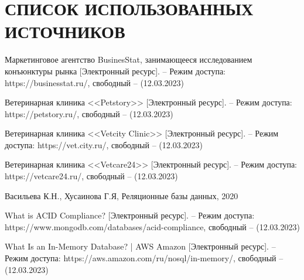 \section*{СПИСОК ИСПОЛЬЗОВАННЫХ ИСТОЧНИКОВ}

\begingroup
\renewcommand{\section}[2]{}
\begin{thebibliography}{}
	
		Маркетинговое агентство  BusinesStat, занимающееся исследованием конъюнктуры рынка [Электронный ресурс]. – Режим доступа: 
		https://businesstat.ru/,
		свободный -- (12.03.2023)
		
		Ветеринарная клиника <<Petstory>> [Электронный ресурс]. – Режим доступа:  https://petstory.ru/,
		свободный -- (12.03.2023)
		
		Ветеринарная клиника <<Vetcity Clinic>> [Электронный ресурс]. – Режим доступа:  https://vet.city.ru/,
		свободный -- (12.03.2023)
		
		Ветеринарная клиника <<Vetcare24>> [Электронный ресурс]. – Режим доступа: https://vetcare24.ru/,
		свободный -- (12.03.2023)
		
		Васильева К.Н., Хусаинова Г.Я,
		Реляционные базы данных,
		2020
		
		What is ACID Compliance? [Электронный ресурс]. – Режим доступа: 	https://www.mongodb.com/databases/acid-compliance,
		свободный -- (12.03.2023)
		
		What Is an In-Memory Database? | AWS Amazon [Электронный ресурс]. – Режим доступа: https://aws.amazon.com/ru/nosql/in-memory/,
		свободный -- (12.03.2023)
		
		
		
	

\end{thebibliography}
\endgroup

\pagebreak